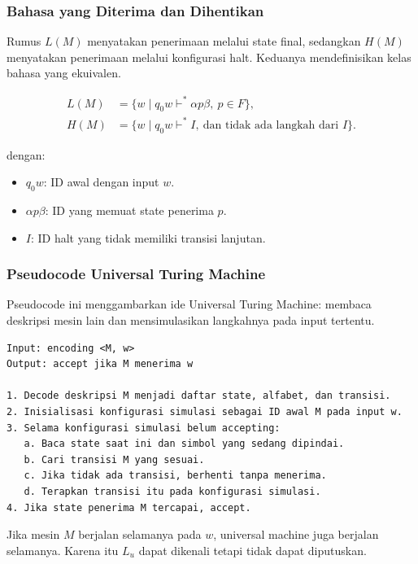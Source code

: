 \subsubsection{Bahasa yang Diterima dan Dihentikan}

\begin{jawab}
Rumus $L(M)$ menyatakan penerimaan melalui state final, sedangkan $H(M)$ menyatakan penerimaan melalui konfigurasi halt. Keduanya mendefinisikan kelas bahasa yang ekuivalen.
\end{jawab}

\begin{align}
    L(M)&=\{w\mid q_0w\vdash^*\alpha p\beta,\ p\in F\}, \label{eq:lm-tm}\\
    H(M)&=\{w\mid q_0w\vdash^* I,\ \text{dan tidak ada langkah dari } I\}. \label{eq:hm-tm}
\end{align}

dengan:
\begin{itemize}
    \item $q_0w$: ID awal dengan input $w$.
    \item $\alpha p\beta$: ID yang memuat state penerima $p$.
    \item $I$: ID halt yang tidak memiliki transisi lanjutan.
\end{itemize}

\subsubsection{Pseudocode Universal Turing Machine}

\begin{jawab}
Pseudocode ini menggambarkan ide Universal Turing Machine: membaca deskripsi mesin lain dan mensimulasikan langkahnya pada input tertentu.
\end{jawab}

\begin{lstlisting}[caption={Pseudocode Universal Turing Machine}, label={lst:utm}]
Input: encoding <M, w>
Output: accept jika M menerima w

1. Decode deskripsi M menjadi daftar state, alfabet, dan transisi.
2. Inisialisasi konfigurasi simulasi sebagai ID awal M pada input w.
3. Selama konfigurasi simulasi belum accepting:
   a. Baca state saat ini dan simbol yang sedang dipindai.
   b. Cari transisi M yang sesuai.
   c. Jika tidak ada transisi, berhenti tanpa menerima.
   d. Terapkan transisi itu pada konfigurasi simulasi.
4. Jika state penerima M tercapai, accept.
\end{lstlisting}

Jika mesin $M$ berjalan selamanya pada $w$, universal machine juga berjalan selamanya. Karena itu $L_u$ dapat dikenali tetapi tidak dapat diputuskan.
